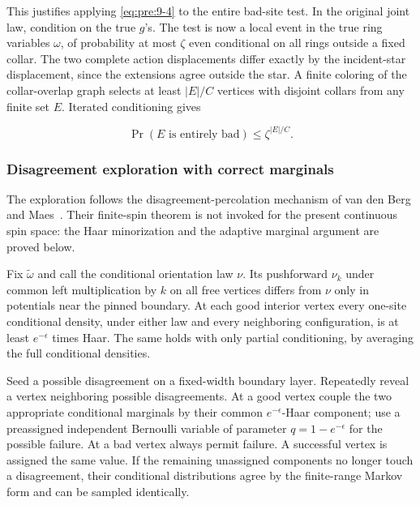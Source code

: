 This justifies applying \eqref{eq:pre:9-4} to the entire bad-site test. In the original joint law, condition on the true \(g\)'s. The test is now a local event in the true ring variables \(\omega\), of probability at most \(\zeta\) even conditional on all rings outside a fixed collar. The two complete action displacements differ exactly by the incident-star displacement, since the extensions agree outside the star. A finite coloring of the collar-overlap graph selects at least \(|E|/C\) vertices with disjoint collars from any finite set \(E\). Iterated conditioning gives

\begin{equation}
\Pr(E\text{ is entirely bad})\leq\zeta^{|E|/C}.
\label{eq:pre:10-1}
\end{equation}

\subsubsection{Disagreement exploration with correct marginals}\label{pre:part-10-2}

The exploration follows the disagreement-percolation mechanism of
van den Berg and Maes~\cite{VanDenBergMaes1994}. Their finite-spin theorem
is not invoked for the present continuous spin space: the Haar
minorization and the adaptive marginal argument are proved below.

Fix \(\widetilde\omega\) and call the conditional orientation law \(\nu\). Its pushforward \(\nu_k\) under common left multiplication by \(k\) on all free vertices differs from \(\nu\) only in potentials near the pinned boundary. At each good interior vertex every one-site conditional density, under either law and every neighboring configuration, is at least \(e^{-\epsilon}\) times Haar. The same holds with only partial conditioning, by averaging the full conditional densities.

Seed a possible disagreement on a fixed-width boundary layer. Repeatedly reveal a vertex neighboring possible disagreements. At a good vertex couple the two appropriate conditional marginals by their common \(e^{-\epsilon}\)-Haar component; use a preassigned independent Bernoulli variable of parameter \(q=1-e^{-\epsilon}\) for the possible failure. At a bad vertex always permit failure. A successful vertex is assigned the same value. If the remaining unassigned components no longer touch a disagreement, their conditional distributions agree by the finite-range Markov form and can be sampled identically.

